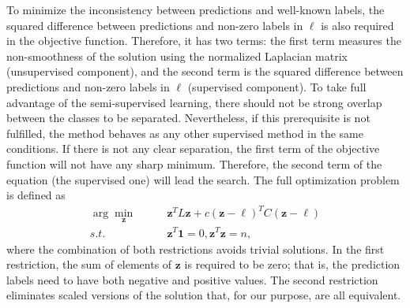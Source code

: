 \documentclass{article}
\newcommand*\Bell{\ensuremath{\boldsymbol\ell}}
\begin{document}
To minimize the inconsistency between predictions and well-known labels, the squared difference between predictions and non-zero labels in $\Bell$ is also required in the objective function. Therefore, it has two terms: the first term measures the non-smoothness of the solution using the normalized Laplacian matrix (unsupervised component), and the second term is the squared difference between predictions and non-zero labels in $\Bell$ (supervised component). To take full advantage of the semi-supervised learning, there should not be strong overlap between the classes to be separated. Nevertheless, if this prerequisite is not fulfilled, the method behaves as any other supervised method in the same conditions. If there is not any clear separation, the first term of the objective function will not have any sharp minimum. Therefore, the second term of the equation (the supervised one) will lead the search. The full optimization problem is defined as
\begin{equation}
	\begin{split}
		\arg\min_{\mathbf{z}} & \qquad \mathbf{z}^TL\mathbf{z} +c(\mathbf{z}-\Bell)^TC(\mathbf{z}-\Bell) \\
		s.t. & \qquad \mathbf{z}^T\mathbf{1} = 0, \mathbf{z}^T\mathbf{z} = n,
	\end{split}
\end{equation}
\noindent where the combination of both restrictions avoids trivial solutions. In the first restriction, the sum of elements of $\mathbf{z}$ is required to be zero; that is, the prediction labels need to have both negative and positive values. The second restriction eliminates scaled versions of the solution that, for our purpose, are all equivalent.
\end{document}
